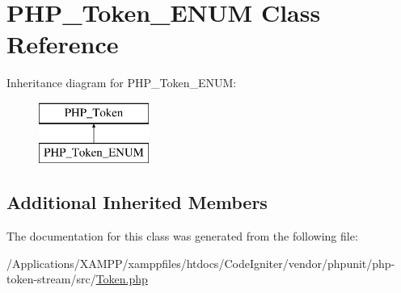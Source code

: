 \hypertarget{class_p_h_p___token___e_n_u_m}{}\section{P\+H\+P\+\_\+\+Token\+\_\+\+E\+N\+UM Class Reference}
\label{class_p_h_p___token___e_n_u_m}
Inheritance diagram for P\+H\+P\+\_\+\+Token\+\_\+\+E\+N\+UM\+:\begin{figure}[H]
\begin{center}
\leavevmode
\includegraphics[height=2.000000cm]{class_p_h_p___token___e_n_u_m}
\end{center}
\end{figure}
\subsection*{Additional Inherited Members}


The documentation for this class was generated from the following file\+:\begin{DoxyCompactItemize}
\item 
/\+Applications/\+X\+A\+M\+P\+P/xamppfiles/htdocs/\+Code\+Igniter/vendor/phpunit/php-\/token-\/stream/src/\mbox{\hyperlink{_token_8php}{Token.\+php}}\end{DoxyCompactItemize}

